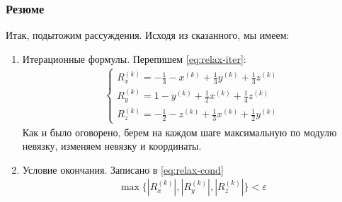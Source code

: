 \subsubsection*{Резюме}
Итак, подытожим рассуждения. Исходя из сказанного, мы имеем:
\begin{enumerate}
  \item Итерационные формулы. Перепишем \eqref{eq:relax-iter}:
\begin{align}
  \begin{cases}
    R_x^{(k)} = -\frac{1}{3} - x^{(k)} + \frac{1}{3} y^{(k)} + \frac{1}{3} z^{(k)} \\
    R_y^{(k)} = 1 - y^{(k)} + \frac{1}{2} x^{(k)} + \frac{1}{4} z^{(k)} \\
    R_z^{(k)} = -\frac{1}{2} - z^{(k)} + \frac{1}{3} x^{(k)} + \frac{1}{2} y^{(k)} 
  \end{cases} 
\end{align}
  Как и было оговорено, берем на каждом шаге максимальную по модулю невязку, изменяем невязку и координаты.
\item Условие окончания. Записано в \eqref{eq:relax-cond}
\begin{align*}
  \max \{ |R_x^{(k)}|, |R_y^{(k)}|, |R_z^{(k)}| \} < \varepsilon
\end{align*}
\end{enumerate}
